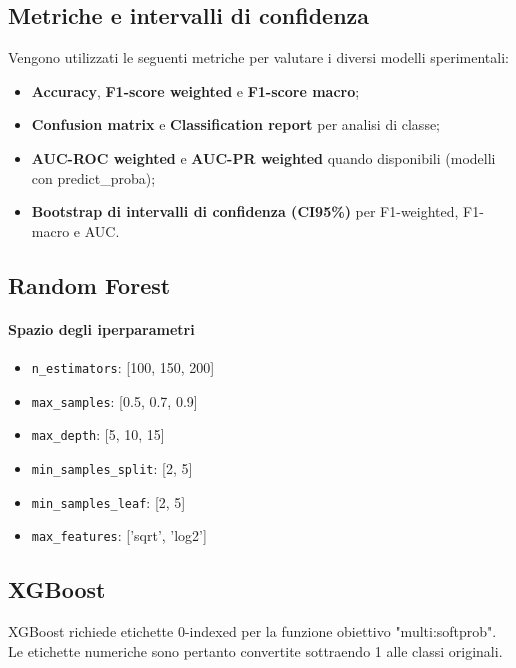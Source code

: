 \documentclass[a4paper,12pt]{report}
\begin{document}
	\subsection{Metriche e intervalli di confidenza}
	Vengono utilizzati le seguenti metriche per valutare i diversi modelli sperimentali:
	\begin{itemize}
		\item \textbf{Accuracy}, \textbf{F1-score weighted} e \textbf{F1-score macro};
		\item \textbf{Confusion matrix} e \textbf{Classification report} per analisi di classe;
		\item \textbf{AUC-ROC weighted} e \textbf{AUC-PR weighted} quando disponibili (modelli con predict\_proba);
		\item \textbf{Bootstrap di intervalli di confidenza (CI95\%)} per F1-weighted, F1-macro e AUC.
	\end{itemize}
	
	\subsection{Random Forest}
	
	\paragraph{Spazio degli iperparametri}
	\begin{itemize}
		\item \texttt{n\_estimators}: [100, 150, 200]
		\item \texttt{max\_samples}: [0.5, 0.7, 0.9]
		\item \texttt{max\_depth}: [5, 10, 15]
		\item \texttt{min\_samples\_split}: [2, 5]
		\item \texttt{min\_samples\_leaf}: [2, 5]
		\item \texttt{max\_features}: ['sqrt', 'log2']
	\end{itemize}
	
	\subsection{XGBoost}
	XGBoost richiede etichette 0-indexed per la funzione obiettivo "multi:softprob". Le etichette numeriche sono pertanto convertite sottraendo 1 alle classi originali.
	
\end{document}
